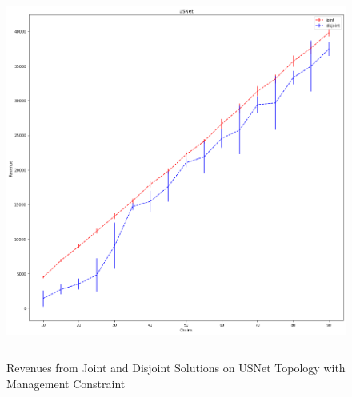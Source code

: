 \begin{figure}[H]
    \centering
    \includegraphics[height=350pt]{plots/joint-vs-disjoint-usnet-2.png}
    \caption{Revenues from Joint and Disjoint Solutions on USNet Topology with Management Constraint}
    \label{fig:joint-vs-disjoint-usnet-2}
\end{figure}
